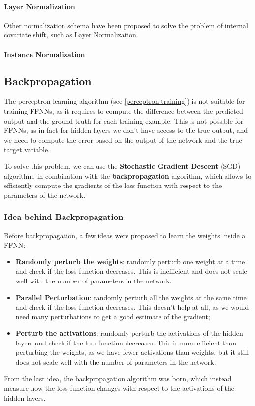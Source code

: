 \paragraph{Layer Normalization}
Other normalization schema have been proposed to solve the problem of internal covariate shift, such as Layer Normalization. 

\paragraph{Instance Normalization}

\subsection{Backpropagation}
The perceptron learning algorithm (see \ref{perceptron-training}) is not suitable for training FFNNs,
as it requires to compute the difference between the predicted output and the ground truth for each training example.
This is not possible for FFNNs, as in fact for hidden layers we don't have access to the true output, and we need to compute 
the error based on the output of the network and the true target variable.

To solve this problem, we can use the \textbf{Stochastic Gradient Descent} (SGD) algorithm, in combination with the \textbf{backpropagation} algorithm, 
which allows to efficiently compute the gradients of the loss function with respect to the parameters of the network.
\subsubsection{Idea behind Backpropagation}
Before backpropagation, a few ideas were proposed to learn the weights inside a FFNN:
\begin{itemize}
    \item \textbf{Randomly perturb the weights}: randomly perturb one weight at a time and check
    if the loss function decreases. This is inefficient and does not scale well with the number of parameters in the network.
    \item \textbf{Parallel Perturbation}: randomly perturb all the weights at the same time and check if the loss function decreases.
    This doesn't help at all, as we would need many perturbations to get a good estimate of the gradient;
    \item \textbf{Perturb the activations}: randomly perturb the activations of the hidden layers and check if the loss function decreases. 
    This is more efficient than perturbing the weights, as we have fewer activations than weights, but it still does not scale well with the number of parameters in the network.
\end{itemize}
From the last idea, the backpropagation algorithm was born, which instead measure how the loss function changes with respect to the activations of the hidden layers.

